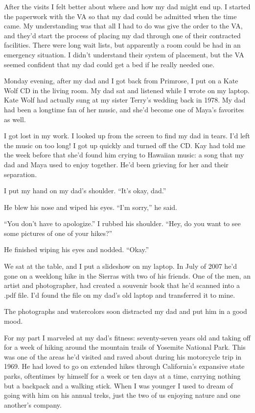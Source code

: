 \documentclass[12pt]{book}
\begin{document}
After the visits I felt better about where and how my dad might end up. I started the paperwork with the VA so that my dad could be admitted when the time came. My understanding was that all I had to do was give the order to the VA, and they'd start the process of placing my dad through one of their contracted facilities. There were long wait lists, but apparently a room could be had in an emergency situation. I didn't understand their system of placement, but the VA seemed confident that my dad could get a bed if he really needed one.

Monday evening, after my dad and I got back from Primrose, I put on a Kate Wolf CD in the living room. My dad sat and listened while I wrote on my laptop. Kate Wolf had actually sung at my sister Terry's wedding back in 1978. My dad had been a longtime fan of her music, and she'd become one of Maya's favorites as well.

I got lost in my work. I looked up from the screen to find my dad in tears. I'd left the music on too long! I got up quickly and turned off the CD. Kay had told me the week before that she'd found him crying to Hawaiian music: a song that my dad and Maya used to enjoy together. He'd been grieving for her and their separation.

I put my hand on my dad's shoulder. ``It's okay, dad.''

He blew his nose and wiped his eyes. ``I'm sorry,'' he said.

``You don't have to apologize.'' I rubbed his shoulder. ``Hey, do you want to see some pictures of one of your hikes?''

He finished wiping his eyes and nodded. ``Okay.''

We sat at the table, and I put a slideshow on my laptop. In July of 2007 he'd gone on a weeklong hike in the Sierras with two of his friends. One of the men, an artist and photographer, had created a souvenir book that he'd scanned into a .pdf file. I'd found the file on my dad's old laptop and transferred it to mine.

The photographs and watercolors soon distracted my dad and put him in a good mood.

For my part I marveled at my dad's fitness: seventy-seven years old and taking off for a week of hiking around the mountain trails of Yosemite National Park. This was one of the areas he'd visited and raved about during his motorcycle trip in 1969. He had loved to go on extended hikes through California's expansive state parks, oftentimes by himself for a week or ten days at a time, carrying nothing but a backpack and a walking stick. When I was younger I used to dream of going with him on his annual treks, just the two of us enjoying nature and one another's company.
\end{document}
